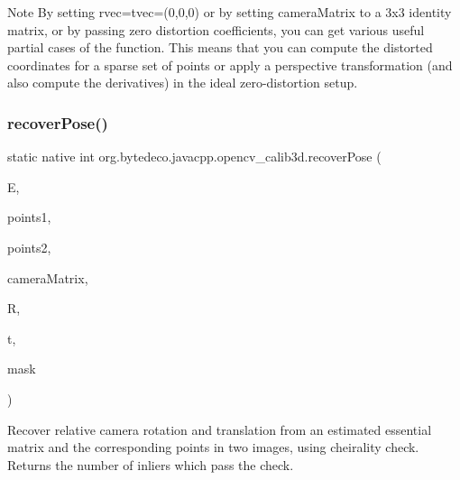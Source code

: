 \begin{DoxyNote}{Note}
By setting rvec=tvec=(0,0,0) or by setting camera\+Matrix to a 3x3 identity matrix, or by passing zero distortion coefficients, you can get various useful partial cases of the function. This means that you can compute the distorted coordinates for a sparse set of points or apply a perspective transformation (and also compute the derivatives) in the ideal zero-\/distortion setup. 
\end{DoxyNote}
\mbox{\label{group__calib3d_gad7bafb76a3a077aa3ce1e3b98d475311}} 
\subsubsection{\texorpdfstring{recover\+Pose()}{recoverPose()}\hspace{0.1cm}{\footnotesize\ttfamily [1/2]}}
{\footnotesize\ttfamily static native int org.\+bytedeco.\+javacpp.\+opencv\+\_\+calib3d.\+recover\+Pose (\begin{DoxyParamCaption}\item[{@By\+Val Mat}]{E,  }\item[{@By\+Val Mat}]{points1,  }\item[{@By\+Val Mat}]{points2,  }\item[{@By\+Val Mat}]{camera\+Matrix,  }\item[{@By\+Val Mat}]{R,  }\item[{@By\+Val Mat}]{t,  }\item[{@By\+Val(null\+Value=\char`\"{}cv\+::\+Input\+Output\+Array(cv\+::no\+Array())\char`\"{}) Mat}]{mask }\end{DoxyParamCaption})\hspace{0.3cm}{\ttfamily [static]}}



Recover relative camera rotation and translation from an estimated essential matrix and the corresponding points in two images, using cheirality check. Returns the number of inliers which pass the check. 


